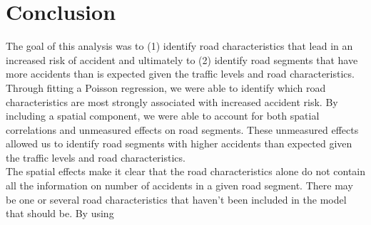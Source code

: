 \chapter{Conclusion}

The goal of this analysis was to (1) identify road characteristics that lead in an increased risk of accident and ultimately to (2) identify road segments that have more accidents than is expected given the traffic levels and road characteristics. Through fitting a Poisson regression, we were able to identify which road characteristics are most strongly associated with increased accident risk. By including a spatial component, we were able to account for both spatial correlations and unmeasured effects on road segments. These unmeasured effects allowed us to identify road segments with higher accidents than expected given the traffic levels and road characteristics. \\

The spatial effects make it clear that the road characteristics alone do not contain all the information on number of accidents in a given road segment. There may be one or several road characteristics that haven't been included in the model that should be. By using 


